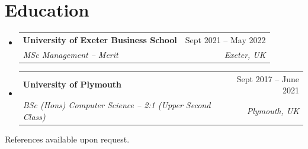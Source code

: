 \documentclass[a4paper,11pt]{article}
\makeatletter
\newcommand{\resumeSubheading}[4]{
  \vspace{-2pt}\item
    \begin{tabular*}{0.97\textwidth}[t]{l@{\extracolsep{\fill}}r}
      \textbf{#1} & #2 \\
      \textit{\small#3} & \textit{\small #4} \\
    \end{tabular*}\vspace{-7pt}
}
\newcommand{\resumeSubHeadingListStart}{\begin{itemize}[leftmargin=0.15in, label={}]}
\newcommand{\resumeSubHeadingListEnd}{\end{itemize}}
\newcommand{\ph}[1]{\textbf{[[#1]]}}
\makeatother
\begin{document}
\section{Education}
\resumeSubHeadingListStart
  \resumeSubheading
    {University of Exeter Business School}{Sept 2021 -- May 2022}
    {MSc Management -- Merit}{Exeter, UK}
  \resumeSubheading
    {University of Plymouth}{Sept 2017 -- June 2021}
    {BSc (Hons) Computer Science -- 2:1 (Upper Second Class)}{Plymouth, UK}
\resumeSubHeadingListEnd


\vspace{-4pt}
\begin{center}\small References available upon request.\end{center}
\end{document}
